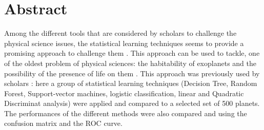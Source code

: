 \documentclass[
12pt, %
a4paper, %
oneside, %
headinclude,footinclude, %
BCOR5mm, %
]{scrartcl}
\begin{document}
\newpage



\section*{Abstract} %
Among the different tools that are considered by scholars to challenge the physical science issues, the statistical learning techniques seems to provide a promising approach to challenge them \cite{carleo2019machine}. This approach can be used to tackle, one of the oldest problem of physical sciences:  the habitability of exoplanets and the possibility of the presence of life on them \cite{seager2013exoplanet}. This approach was previously used by scholars \cite{armstrong2020exoplanet,saha2018machine}: here a group of statistical learning techniques (Decision Tree, Random Forest, Support-vector machines, logistic classification, linear and Quadratic Discriminat analysis) were applied and compared to a selected set of 500 planets. The performances of the different methods were also compared and using the confusion matrix and the ROC curve.

\nocite{*}
\setcounter{tocdepth}{2} %

\tableofcontents %




\newpage %
\end{document}
